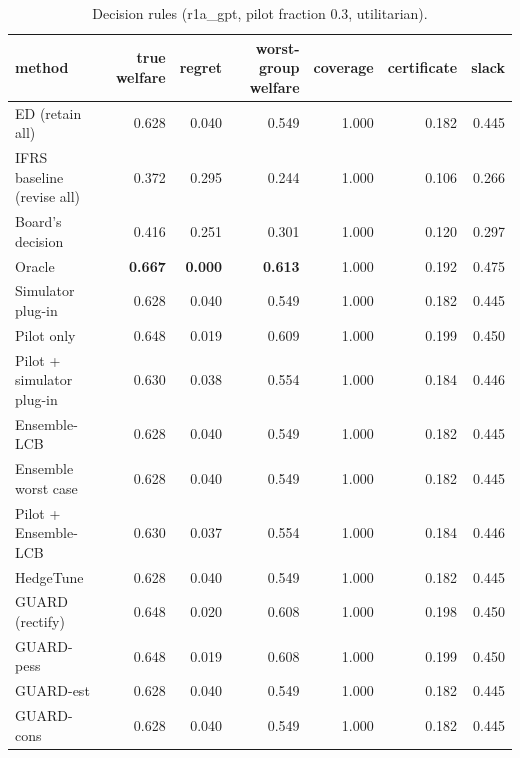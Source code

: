 \begin{table}[t]
\centering
\small
\begin{tabular}{lrrrrrr}
\toprule
method & true welfare & regret & worst-group welfare & coverage & certificate & slack \\
\midrule
ED (retain all) & 0.628 & 0.040 & 0.549 & 1.000 & 0.182 & 0.445 \\
IFRS baseline (revise all) & 0.372 & 0.295 & 0.244 & 1.000 & 0.106 & 0.266 \\
Board's decision & 0.416 & 0.251 & 0.301 & 1.000 & 0.120 & 0.297 \\
Oracle & \textbf{0.667} & \textbf{0.000} & \textbf{0.613} & 1.000 & 0.192 & 0.475 \\
Simulator plug-in & 0.628 & 0.040 & 0.549 & 1.000 & 0.182 & 0.445 \\
Pilot only & 0.648 & 0.019 & 0.609 & 1.000 & 0.199 & 0.450 \\
Pilot + simulator plug-in & 0.630 & 0.038 & 0.554 & 1.000 & 0.184 & 0.446 \\
Ensemble-LCB & 0.628 & 0.040 & 0.549 & 1.000 & 0.182 & 0.445 \\
Ensemble worst case & 0.628 & 0.040 & 0.549 & 1.000 & 0.182 & 0.445 \\
Pilot + Ensemble-LCB & 0.630 & 0.037 & 0.554 & 1.000 & 0.184 & 0.446 \\
HedgeTune & 0.628 & 0.040 & 0.549 & 1.000 & 0.182 & 0.445 \\
GUARD (rectify) & 0.648 & 0.020 & 0.608 & 1.000 & 0.198 & 0.450 \\
GUARD-pess & 0.648 & 0.019 & 0.608 & 1.000 & 0.199 & 0.450 \\
GUARD-est & 0.628 & 0.040 & 0.549 & 1.000 & 0.182 & 0.445 \\
GUARD-cons & 0.628 & 0.040 & 0.549 & 1.000 & 0.182 & 0.445 \\
\bottomrule
\end{tabular}
\caption{Decision rules (r1a\_gpt, pilot fraction 0.3, utilitarian).}
\label{tab:methods-utilitarian}
\end{table}
